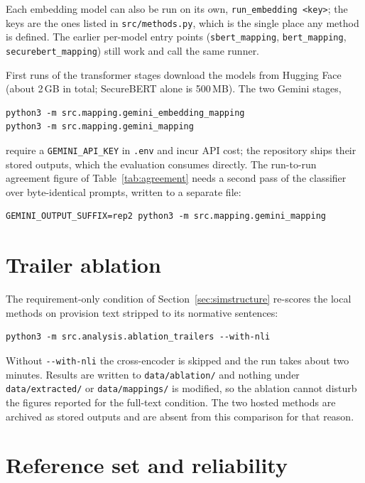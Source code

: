 \noindent Each embedding model can also be run on its own,
\texttt{run\_embedding <key>}; the keys are the ones listed in
\texttt{src/methods.py}, which is the single place any method is defined. The
earlier per-model entry points (\texttt{sbert\_mapping},
\texttt{bert\_mapping}, \texttt{securebert\_mapping}) still work and call the
same runner.

First runs of the transformer stages download the models from Hugging Face
(about 2\,GB in total; SecureBERT alone is 500\,MB). The two Gemini stages,

\begin{verbatim}
python3 -m src.mapping.gemini_embedding_mapping
python3 -m src.mapping.gemini_mapping
\end{verbatim}

\noindent require a \texttt{GEMINI\_API\_KEY} in \texttt{.env} and incur API
cost; the repository ships their stored outputs, which the evaluation
consumes directly. The run-to-run agreement figure of
Table~\ref{tab:agreement} needs a second pass of the classifier over
byte-identical prompts, written to a separate file:

\begin{verbatim}
GEMINI_OUTPUT_SUFFIX=rep2 python3 -m src.mapping.gemini_mapping
\end{verbatim}

\section*{Trailer ablation}

The requirement-only condition of Section~\ref{sec:simstructure} re-scores the
local methods on provision text stripped to its normative sentences:

\begin{verbatim}
python3 -m src.analysis.ablation_trailers --with-nli
\end{verbatim}

\noindent Without \texttt{-{}-with-nli} the cross-encoder is skipped and the run
takes about two minutes. Results are written to \texttt{data/ablation/} and
nothing under \texttt{data/extracted/} or \texttt{data/mappings/} is modified, so
the ablation cannot disturb the figures reported for the full-text condition. The
two hosted methods are archived as stored outputs and are absent from this
comparison for that reason.

\section*{Reference set and reliability}

